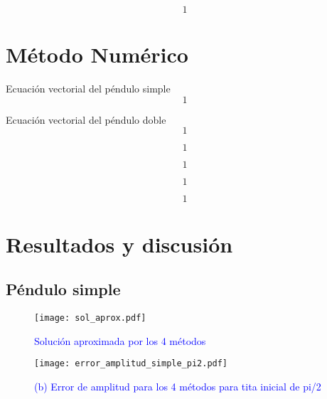 \documentclass[aps,prb,twocolumn,superscriptaddress,floatfix,longbibliography]{revtex4-2}
\newcounter{para}
\begin{document}
\begin{equation}
  1
  \label{eq:amplitud_doble}
\end{equation}


\section{Método Numérico}

Ecuación vectorial del péndulo simple
\begin{equation}
  1
  \label{eq:pendulo_simple_vec}
\end{equation}


Ecuación vectorial del péndulo doble
\begin{equation}
  1
  \label{eq:pendulo_doble_vec}
\end{equation}

\begin{equation}
  1
  \label{eq:Euler_implicito}
\end{equation}

\begin{equation}
  1
  \label{eq:Crank_Nicholson}
\end{equation}

\begin{equation}
  1
  \label{eq:Runge_Kutta_4}
\end{equation}

\begin{equation}
  1
  \label{eq:Leap_Frog}
\end{equation}



\section{Resultados y discusión}

\subsection{Péndulo simple}


\begin{figure}[h]
  \texttt{[image: sol\_aprox.pdf]}
  \caption{\textcolor{blue}{Solución aproximada por los 4 métodos}}
   \label{fig:sol_aprox}
\end{figure}



\begin{figure}[h]
  \texttt{[image: error\_amplitud\_simple\_pi2.pdf]}
  \caption{\textcolor{blue}{(b) Error de amplitud para los 4 métodos para tita inicial de pi/2}}
   \label{fig:error_amplitud_simple_pi2}
\end{figure}
\end{document}

